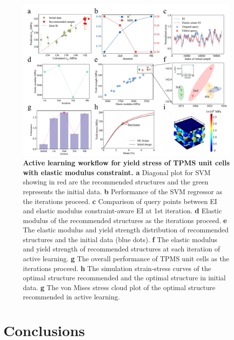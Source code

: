 \documentclass[preprint,review,12pt,authoryear]{elsarticle}
\begin{document}
\begin{figure}
    \centering
    \includegraphics[width=1\linewidth]{figures/7.pdf}
    \caption{\textbf{Active learning workflow for yield stress of TPMS unit cells with elastic modulus constraint. a} Diagonal plot for SVM showing in red are the recommended structures and the green represents the initial data. \textbf{b} Performance of the SVM regressor as the iterations proceed. \textbf{c} Comparison of query points between EI and elastic modulus constraint-aware EI at 1st iteration. \textbf{d} Elastic modulus of the recommended structures as the iterations proceed. \textbf{e} The elastic modulus and yield strength distribution of recommended structures and the initial data (blue dots). \textbf{f} The elastic modulus and yield strength of recommended structures at each iteration of active learning. \textbf{g} The overall performance of TPMS unit cells as the iterations proceed. \textbf{h} The simulation strain-stress curves of the optimal structure recommended and the optimal 
structure in initial data. \textbf{g} The von Mises stress cloud plot of the optimal structure recommended in active learning.}
    \label{fig:7}
\end{figure}

\section{Conclusions}
\end{document}
